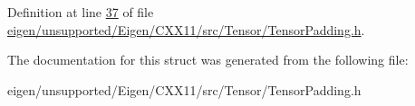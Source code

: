 Definition at line \hyperlink{eigen_2unsupported_2_eigen_2_c_x_x11_2src_2_tensor_2_tensor_padding_8h_source_l00037}{37} of file \hyperlink{eigen_2unsupported_2_eigen_2_c_x_x11_2src_2_tensor_2_tensor_padding_8h_source}{eigen/unsupported/\+Eigen/\+C\+X\+X11/src/\+Tensor/\+Tensor\+Padding.\+h}.



The documentation for this struct was generated from the following file\+:\begin{DoxyCompactItemize}
\item 
eigen/unsupported/\+Eigen/\+C\+X\+X11/src/\+Tensor/\+Tensor\+Padding.\+h\end{DoxyCompactItemize}
